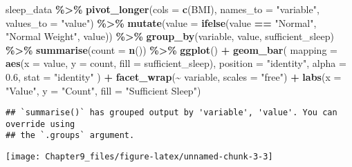 \documentclass[
  11pt,
]{article}
\newenvironment{Shaded}{\begin{snugshade}}{\end{snugshade}}
\newcommand{\AttributeTok}[1]{\textcolor[rgb]{0.13,0.29,0.53}{#1}}
\newcommand{\FloatTok}[1]{\textcolor[rgb]{0.00,0.00,0.81}{#1}}
\newcommand{\FunctionTok}[1]{\textcolor[rgb]{0.13,0.29,0.53}{\textbf{#1}}}
\newcommand{\NormalTok}[1]{#1}
\newcommand{\SpecialCharTok}[1]{\textcolor[rgb]{0.81,0.36,0.00}{\textbf{#1}}}
\newcommand{\StringTok}[1]{\textcolor[rgb]{0.31,0.60,0.02}{#1}}
\begin{document}
\begin{Shaded}
\begin{Highlighting}[]
\NormalTok{sleep\_data }\SpecialCharTok{\%\textgreater{}\%}
  \FunctionTok{pivot\_longer}\NormalTok{(}\AttributeTok{cols =} \FunctionTok{c}\NormalTok{(BMI), }\AttributeTok{names\_to =} \StringTok{"variable"}\NormalTok{, }\AttributeTok{values\_to =} \StringTok{"value"}\NormalTok{) }\SpecialCharTok{\%\textgreater{}\%}
  \FunctionTok{mutate}\NormalTok{(}\AttributeTok{value =} \FunctionTok{ifelse}\NormalTok{(value }\SpecialCharTok{==} \StringTok{"Normal"}\NormalTok{, }\StringTok{"Normal Weight"}\NormalTok{, value)) }\SpecialCharTok{\%\textgreater{}\%}
  \FunctionTok{group\_by}\NormalTok{(variable, value, sufficient\_sleep) }\SpecialCharTok{\%\textgreater{}\%}
  \FunctionTok{summarise}\NormalTok{(}\AttributeTok{count =} \FunctionTok{n}\NormalTok{()) }\SpecialCharTok{\%\textgreater{}\%}
  \FunctionTok{ggplot}\NormalTok{() }\SpecialCharTok{+}
  \FunctionTok{geom\_bar}\NormalTok{(}
    \AttributeTok{mapping =} \FunctionTok{aes}\NormalTok{(}\AttributeTok{x =}\NormalTok{ value, }\AttributeTok{y =}\NormalTok{ count, }\AttributeTok{fill =}\NormalTok{ sufficient\_sleep),}
    \AttributeTok{position =} \StringTok{"identity"}\NormalTok{,}
    \AttributeTok{alpha =} \FloatTok{0.6}\NormalTok{,}
    \AttributeTok{stat =} \StringTok{"identity"}
\NormalTok{  ) }\SpecialCharTok{+}
  \FunctionTok{facet\_wrap}\NormalTok{(}\SpecialCharTok{\textasciitilde{}}\NormalTok{ variable, }\AttributeTok{scales =} \StringTok{"free"}\NormalTok{) }\SpecialCharTok{+}
  \FunctionTok{labs}\NormalTok{(}\AttributeTok{x =} \StringTok{"Value"}\NormalTok{, }\AttributeTok{y =} \StringTok{"Count"}\NormalTok{, }\AttributeTok{fill =} \StringTok{"Sufficient Sleep"}\NormalTok{)}
\end{Highlighting}
\end{Shaded}

\begin{verbatim}
## `summarise()` has grouped output by 'variable', 'value'. You can override using
## the `.groups` argument.
\end{verbatim}

\begin{center}\texttt{[image: Chapter9\_files/figure-latex/unnamed-chunk-3-3]} \end{center}
\end{document}
